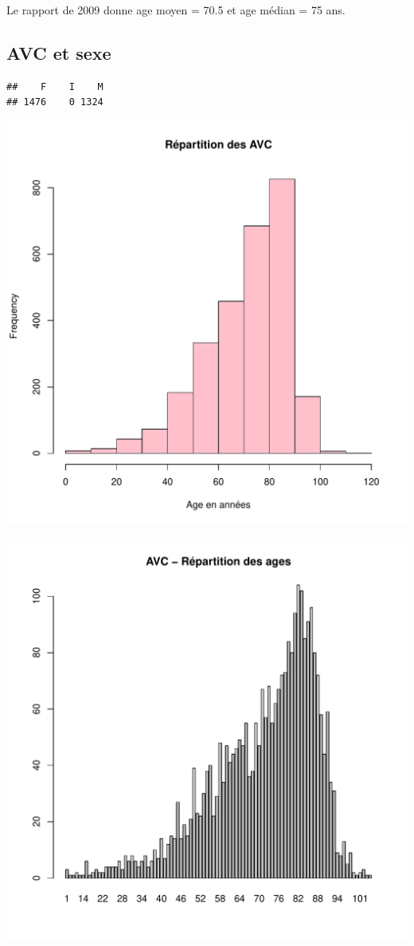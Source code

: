 \documentclass[12pt,english,french,twoside]{book}\usepackage[]{graphicx}\usepackage[]{color}
\makeatletter
\def\maxwidth{ %
  \ifdim\Gin@nat@width>\linewidth
    \linewidth
  \else
    \Gin@nat@width
  \fi
}
\newenvironment{kframe}{%
 \def\at@end@of@kframe{}%
 \ifinner\ifhmode%
  \def\at@end@of@kframe{\end{minipage}}%
  \begin{minipage}{\columnwidth}%
 \fi\fi%
 \def\FrameCommand##1{\hskip\@totalleftmargin \hskip-\fboxsep
 \colorbox{shadecolor}{##1}\hskip-\fboxsep
     \hskip-\linewidth \hskip-\@totalleftmargin \hskip\columnwidth}%
 \MakeFramed {\advance\hsize-\width
   \@totalleftmargin\z@ \linewidth\hsize
   \@setminipage}}%
 {\par\unskip\endMakeFramed%
 \at@end@of@kframe}
\newenvironment{knitrout}{}{} %
\makeatother
\begin{document}
Le rapport de 2009 donne age moyen = 70.5 et age médian = 75 ans.

\subsection*{AVC et sexe}
\begin{knitrout}
\color{fgcolor}\begin{kframe}
\begin{verbatim}
##    F    I    M 
## 1476    0 1324
\end{verbatim}
\end{kframe}
\includegraphics[width=\maxwidth]{figure/avc_sexe1} 

\includegraphics[width=\maxwidth]{figure/avc_sexe2} 


\end{knitrout}
\end{document}
